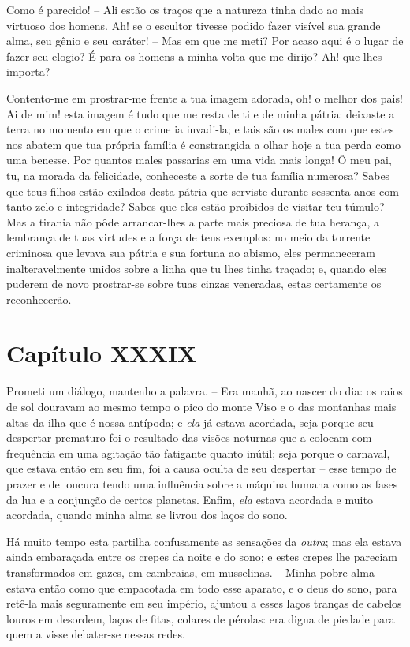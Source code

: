  Como é parecido! -- Ali estão os traços que a natureza tinha dado ao
mais virtuoso dos homens. Ah! se o escultor tivesse podido fazer
visível sua grande alma, seu gênio e seu caráter! -- Mas em que me
meti? Por acaso aqui é o lugar de fazer seu elogio? É para os homens a
minha volta que me dirijo? Ah! que lhes importa? 

 Contento-me em prostrar-me frente a tua imagem adorada, oh! o melhor
dos pais! Ai de mim! esta imagem é tudo que me resta de ti e de minha
pátria: deixaste a terra no momento em que o crime ia invadi-la; e tais
são os males com que estes nos abatem que tua própria família é
constrangida a olhar hoje a tua perda como uma benesse. Por quantos
males passarias em uma vida mais longa! Ô meu pai, tu, na morada
da felicidade, conheceste a sorte de tua família numerosa? Sabes que teus
filhos estão exilados desta pátria que serviste durante sessenta anos
com tanto zelo e integridade? Sabes que eles estão proibidos de visitar
teu túmulo? -- Mas a tirania não pôde arrancar-lhes a parte mais
preciosa de tua herança, a lembrança de tuas virtudes e a força de teus
exemplos: no meio da torrente criminosa que levava sua pátria e sua
fortuna ao abismo, eles permaneceram inalteravelmente unidos sobre a
linha que tu lhes tinha traçado; e, quando eles puderem de novo
prostrar-se sobre tuas cinzas veneradas, estas certamente os
reconhecerão. 

\section*{Capítulo XXXIX}

 Prometi um diálogo, mantenho a palavra. -- Era manhã, ao nascer do
dia: os raios de sol douravam ao mesmo tempo o pico do monte Viso e o
das montanhas mais altas da ilha que é nossa antípoda; e \textit{ela}
já estava acordada, seja porque seu despertar prematuro foi o resultado
das visões noturnas que a colocam com frequência em uma agitação tão
fatigante quanto inútil; seja porque o carnaval, que estava então em
seu fim, foi a causa oculta de seu despertar -- esse tempo de prazer e
de loucura tendo uma influência sobre a máquina humana como as fases da
lua e a conjunção de certos planetas. Enfim, \textit{ela} estava
acordada e muito acordada, quando minha alma se livrou dos laços do
sono. 

 Há muito tempo esta partilha confusamente as sensações da
\textit{outra}; mas ela estava ainda embaraçada entre os crepes da
noite e do sono; e estes crepes lhe pareciam transformados em gazes, em
cambraias, em musselinas. -- Minha pobre alma estava então como que
empacotada em todo esse aparato, e o deus do sono, para retê-la mais
seguramente em seu império, ajuntou a esses laços tranças de cabelos
louros em desordem, laços de fitas, colares de pérolas: era digna de
piedade para quem a visse debater-se nessas redes. 

